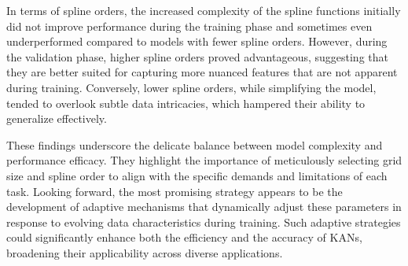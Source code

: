 \documentclass{article}
\begin{document}
In terms of spline orders, the increased complexity of the spline functions initially did not improve performance during the training phase and sometimes even underperformed compared to models with fewer spline orders.
However, during the validation phase, higher spline orders proved advantageous, suggesting that they are better suited for capturing more nuanced features that are not apparent during training.
Conversely, lower spline orders, while simplifying the model, tended to overlook subtle data intricacies, which hampered their ability to generalize effectively.

These findings underscore the delicate balance between model complexity and performance efficacy.
They highlight the importance of meticulously selecting grid size and spline order to align with the specific demands and limitations of each task.
Looking forward, the most promising strategy appears to be the development of adaptive mechanisms that dynamically adjust these parameters in response to evolving data characteristics during training.
Such adaptive strategies could significantly enhance both the efficiency and the accuracy of KANs, broadening their applicability across diverse applications.


\clearpage %





\end{document}
